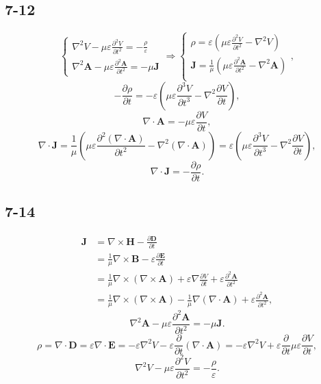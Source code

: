 \documentclass[6pt,a4paper]{article}
\begin{document}
\subsection{7-12}
$$\left\{\begin{aligned}
\nabla^2V-\mu\varepsilon\frac{\partial^2V}{\partial t^2}=-\frac{\rho}{\varepsilon} \\
\nabla^2\mathbf{A}-\mu\varepsilon\frac{\partial^2\mathbf{A}}{\partial t^2}=-\mu\mathbf{J}
\end{aligned}\right.\Longrightarrow\left\{\begin{aligned}
\rho=\varepsilon\left(\mu\varepsilon\frac{\partial^2V}{\partial t^2}-\nabla^2V\right) \\
\mathbf{J}=\frac{1}{\mu}\left(\mu\varepsilon\frac{\partial^2\mathbf{A}}{\partial t^2}-\nabla^2\mathbf{A}\right) \\
\end{aligned}\right.,$$
$$-\frac{\partial\rho}{\partial t}=-\varepsilon\left(\mu\varepsilon\frac{\partial^3V}{\partial t^3}-\nabla^2\frac{\partial V}{\partial t}\right),$$
$$\nabla\cdot\mathbf{A}=-\mu\varepsilon\frac{\partial V}{\partial t},$$
$$\nabla\cdot\mathbf{J}=\frac{1}{\mu}\left(\mu\varepsilon\frac{\partial^2(\nabla\cdot\mathbf{A})}{\partial t^2}-\nabla^2(\nabla\cdot\mathbf{A})\right)=\varepsilon\left(\mu\varepsilon\frac{\partial^3V}{\partial t^3}-\nabla^2\frac{\partial V}{\partial t}\right),$$
$$\nabla\cdot \mathbf{J}=-\frac{\partial\rho}{\partial t}.$$

\subsection{7-14}
\begin{align*}
\mathbf{J}&=\nabla\times\mathbf{H}-\frac{\partial\mathbf{D}}{\partial t}\\
&=\frac{1}{\mu}\nabla\times\mathbf{B}-\varepsilon\frac{\partial\mathbf{E}}{\partial t}\\
&=\frac{1}{\mu}\nabla\times(\nabla\times\mathbf{A})+\varepsilon\nabla\frac{\partial V}{\partial t}+\varepsilon\frac{\partial^2\mathbf{A}}{\partial t^2}\\
&=\frac{1}{\mu}\nabla\times(\nabla\times\mathbf{A})-\frac{1}{\mu}\nabla(\nabla\cdot\mathbf{A})+\varepsilon\frac{\partial^2\mathbf{A}}{\partial t^2},
\end{align*}
$$\nabla^2\mathbf{A}-\mu\varepsilon\frac{\partial^2\mathbf{A}}{\partial t^2}=-\mu\mathbf{J}.$$
$$\rho=\nabla\cdot\mathbf{D}=\varepsilon\nabla\cdot\mathbf{E}=-\varepsilon\nabla^2 V-\varepsilon\frac{\partial}{\partial t}(\nabla\cdot\mathbf{A})=-\varepsilon\nabla^2 V+\varepsilon\frac{\partial}{\partial t}\mu\varepsilon\frac{\partial V}{\partial t},$$
$$\nabla^2V-\mu\varepsilon\frac{\partial^2V}{\partial t^2}=-\frac{\rho}{\varepsilon}.$$
\end{document}
